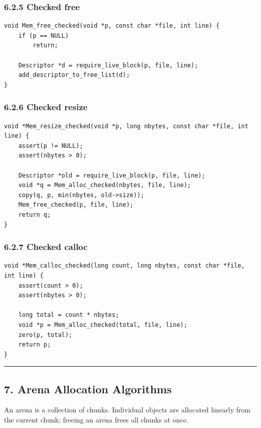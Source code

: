 \documentclass[11pt]{article}
\begin{document}
\subsubsection{6.2.5 Checked free}\label{checked-free}

\begin{verbatim}
void Mem_free_checked(void *p, const char *file, int line) {
    if (p == NULL)
        return;

    Descriptor *d = require_live_block(p, file, line);
    add_descriptor_to_free_list(d);
}
\end{verbatim}

\subsubsection{6.2.6 Checked resize}\label{checked-resize}

\begin{verbatim}
void *Mem_resize_checked(void *p, long nbytes, const char *file, int line) {
    assert(p != NULL);
    assert(nbytes > 0);

    Descriptor *old = require_live_block(p, file, line);
    void *q = Mem_alloc_checked(nbytes, file, line);
    copy(q, p, min(nbytes, old->size));
    Mem_free_checked(p, file, line);
    return q;
}
\end{verbatim}

\subsubsection{6.2.7 Checked calloc}\label{checked-calloc}

\begin{verbatim}
void *Mem_calloc_checked(long count, long nbytes, const char *file, int line) {
    assert(count > 0);
    assert(nbytes > 0);

    long total = count * nbytes;
    void *p = Mem_alloc_checked(total, file, line);
    zero(p, total);
    return p;
}
\end{verbatim}

\begin{center}\rule{0.5\linewidth}{0.5pt}\end{center}

\subsection{7. Arena Allocation Algorithms}\label{arena-allocation-algorithms}

An arena is a collection of chunks. Individual objects are allocated linearly from the current chunk; freeing an arena frees all chunks at once.
\end{document}
